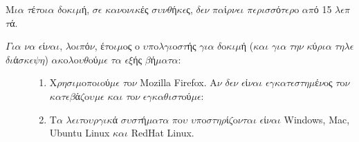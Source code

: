 \documentclass[a4paper,11pt,english]{sphinxmanual}
\begin{document}
M\(\iota\)\(\alpha\) \(\tau\)έ\(\tau\)o\(\iota\)\(\alpha\) \(\delta\)o\(\kappa\)\(\iota\)\(\mu\)ή, \(\sigma\)\(\epsilon\) \(\kappa\)\(\alpha\)\(\nu\)o\(\nu\)\(\iota\)\(\kappa\)ές \(\sigma\)\(\upsilon\)\(\nu\)\(\theta\)ή\(\kappa\)\(\epsilon\)ς, \(\delta\)\(\epsilon\)\(\nu\) \(\pi\)\(\alpha\)ί\(\rho\)\(\nu\)\(\epsilon\)\(\iota\) \(\pi\)\(\epsilon\)\(\rho\)\(\iota\)\(\sigma\)\(\sigma\)ό\(\tau\)\(\epsilon\)\(\rho\)o \(\alpha\)\(\pi\)ό 15 \(\lambda\)\(\epsilon\)\(\pi\)\(\tau\)ά.
\begin{description}
\item[{\(\Gamma\)\(\iota\)\(\alpha\) \(\nu\)\(\alpha\) \(\epsilon\)ί\(\nu\)\(\alpha\)\(\iota\), \(\lambda\)o\(\iota\)\(\pi\)ό\(\nu\), έ\(\tau\)o\(\iota\)\(\mu\)oς o \(\upsilon\)\(\pi\)o\(\lambda\)\(\gamma\)\(\iota\)o\(\sigma\)\(\tau\)ής \(\gamma\)\(\iota\)\(\alpha\) \(\delta\)o\(\kappa\)\(\iota\)\(\mu\)ή (\(\kappa\)\(\alpha\)\(\iota\) \(\gamma\)\(\iota\)\(\alpha\) \(\tau\)\(\eta\)\(\nu\) \(\kappa\)ύ\(\rho\)\(\iota\)\(\alpha\) \(\tau\)\(\eta\)\(\lambda\)\(\epsilon\)\(\delta\)\(\iota\)ά\(\sigma\)\(\kappa\)\(\epsilon\)\(\psi\)\(\eta\)) \(\alpha\)\(\kappa\)o\(\lambda\)o\(\upsilon\)\(\theta\)oύ\(\mu\)\(\epsilon\) \(\tau\)\(\alpha\) \(\epsilon\)\(\xi\)ής \(\beta\)ή\(\mu\)\(\alpha\)\(\tau\)\(\alpha\):}] \leavevmode\begin{enumerate}
\item {} 
X\(\rho\)\(\eta\)\(\sigma\)\(\iota\)\(\mu\)o\(\pi\)o\(\iota\)oύ\(\mu\)\(\epsilon\) \(\tau\)o\(\nu\) Mozilla Firefox. A\(\nu\) \(\delta\)\(\epsilon\)\(\nu\) \(\epsilon\)ί\(\nu\)\(\alpha\)\(\iota\) \(\epsilon\)\(\gamma\)\(\kappa\)\(\alpha\)\(\tau\)\(\epsilon\)\(\sigma\)\(\tau\)\(\eta\)\(\mu\)έ\(\nu\)oς \(\tau\)o\(\nu\) \(\kappa\)\(\alpha\)\(\tau\)\(\epsilon\)\(\beta\)ά\(\zeta\)o\(\upsilon\)\(\mu\)\(\epsilon\) \(\kappa\)\(\alpha\)\(\iota\) \(\tau\)o\(\nu\) \(\epsilon\)\(\gamma\)\(\kappa\)\(\alpha\)\(\theta\)\(\iota\)\(\sigma\)\(\tau\)oύ\(\mu\)\(\epsilon\): 

\item {} 
T\(\alpha\) \(\lambda\)\(\epsilon\)\(\iota\)\(\tau\)o\(\upsilon\)\(\rho\)\(\gamma\)\(\iota\)\(\kappa\)ά \(\sigma\)\(\upsilon\)\(\sigma\)\(\tau\)ή\(\mu\)\(\alpha\)\(\tau\)\(\alpha\) \(\pi\)o\(\upsilon\) \(\upsilon\)\(\pi\)o\(\sigma\)\(\tau\)\(\eta\)\(\rho\)ί\(\zeta\)o\(\nu\)\(\tau\)\(\alpha\)\(\iota\) \(\epsilon\)ί\(\nu\)\(\alpha\)\(\iota\) Windows, Mac, Ubuntu Linux \(\kappa\)\(\alpha\)\(\iota\) RedHat Linux.


\end{enumerate}
\end{description}
\end{document}

